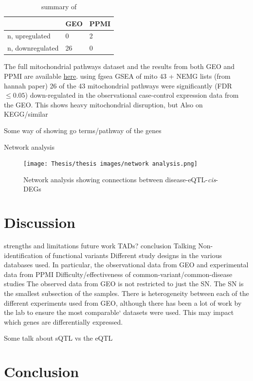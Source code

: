 \documentclass{article}
\begin{document}
\begin{table}[h]
\centering
\begin{tabular}{|l|l|l|}
\hline
                 & GEO & PPMI \\ \hline
n, upregulated   & 0   & 2    \\ \hline
n, downregulated & 26  & 0    \\ \hline
\end{tabular}
\caption{summary of}
\end{table}

The full mitochondrial pathways dataset and the results from both GEO and PPMI are available \href{}{here}.
using fgsea
GSEA of mito 43 + NEMG lists (from hannah paper)
26 of the 43 mitochondrial pathways were significantly (FDR $\leq0.05$) down-regulated in the observational case-control expression data from the GEO. This shows heavy mitochondrial disruption, but
Also on KEGG/similar

Some way of showing go terms/pathway of the genes

Network analysis
\newpage
\begin{landscape}
\begin{figure}[h]
    \centering
    \texttt{[image: Thesis/thesis images/network analysis.png]}
    \caption{Network analysis showing connections between disease-eQTL-\textit{cis}-DEGs}
    \label{fig:enter-label}
\end{figure}
\end{landscape}
\section{Discussion}

strengths and limitations
future work
TADs?
conclusion
Talking
Non-identification of functional variants
Different study designs in the various databases used. In particular, the observational data from GEO and experimental data from PPMI 
Difficulty/effectiveness of common-variant/common-disease studies
The observed data from GEO is not restricted to just the SN. The SN is the smallest subsection of the samples. 
There is heterogeneity between each of the different experiments used from GEO, although there has been a lot of work by the lab to ensure the most comparable` datasets were used. 
This may impact which genes are differentially expressed.

Some talk about sQTL vs the eQTL

\section{Conclusion}




\end{document}
